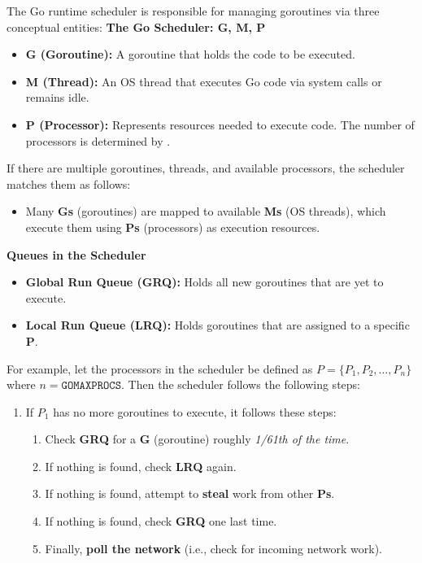 \vspace{2em}
\begin{Def}

    The Go runtime scheduler is responsible for managing goroutines via three conceptual entities:
\textbf{The Go Scheduler: G, M, P}
\begin{itemize}
    \item \textbf{G (Goroutine):} A goroutine that holds the code to be executed.
    \item \textbf{M (Thread):} An OS thread that executes Go code via system calls or remains idle.
    \item \textbf{P (Processor):} Represents resources needed to execute code. The number of processors is determined by .
\end{itemize}

\noindent
If there are multiple goroutines, threads, and available processors, the scheduler matches them as follows:
\begin{itemize}
    \item Many \textbf{Gs} (goroutines) are mapped to available \textbf{Ms} (OS threads), which execute them using \textbf{Ps} (processors) as execution resources.
\end{itemize}

\noindent
\textbf{Queues in the Scheduler}
\begin{itemize}
    \item \textbf{Global Run Queue (GRQ):} Holds all new goroutines that are yet to execute.
    \item \textbf{Local Run Queue (LRQ):} Holds goroutines that are assigned to a specific \textbf{P}.
\end{itemize}

\noindent
For example, let the processors in the scheduler be defined as 
$
P = \{ P_1, P_2, \dots, P_n \}
$
where \( n = \texttt{GOMAXPROCS} \). Then the scheduler follows the following steps:
\begin{enumerate}
    \item If \( P_1 \) has no more goroutines to execute, it follows these steps:
    \begin{enumerate}
        \item Check \textbf{GRQ} for a \textbf{G} (goroutine) roughly \textit{1/61th of the time}.
        \item If nothing is found, check \textbf{LRQ} again.
        \item If nothing is found, attempt to \textbf{steal} work from other \textbf{Ps}.
        \item If nothing is found, check \textbf{GRQ} one last time.
        \item Finally, \textbf{poll the network} (i.e., check for incoming network work).
    \end{enumerate}
\end{enumerate}
\end{Def}

